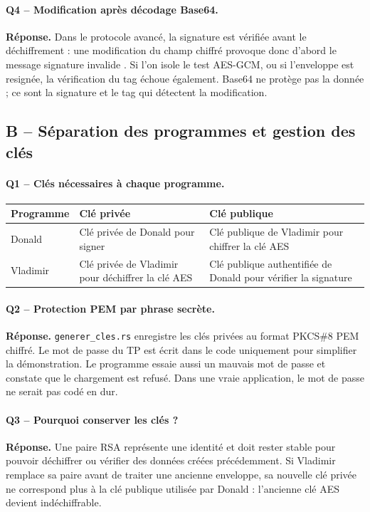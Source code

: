 \documentclass[11pt,a4paper]{article}
\newcommand{\fichier}[1]{\texttt{#1}}
\newcommand{\reponse}{\textbf{Réponse.} }
\begin{document}
\paragraph{Q4 -- Modification après décodage Base64.}
\reponse Dans le protocole avancé, la signature est vérifiée avant le déchiffrement :
une modification du champ chiffré provoque donc d'abord le message
\og signature invalide \fg{}. Si l'on isole le test AES-GCM, ou si l'enveloppe est
resignée, la vérification du tag échoue également. Base64 ne protège pas la donnée ;
ce sont la signature et le tag qui détectent la modification.

\subsection{B -- Séparation des programmes et gestion des clés}

\paragraph{Q1 -- Clés nécessaires à chaque programme.}

\begin{table}[h]
\centering
\begin{tabularx}{\textwidth}{p{2.7cm}X X}
\toprule
\textbf{Programme} & \textbf{Clé privée} & \textbf{Clé publique} \\
\midrule
Donald & Clé privée de Donald pour signer & Clé publique de Vladimir pour chiffrer la clé AES \\
Vladimir & Clé privée de Vladimir pour déchiffrer la clé AES & Clé publique authentifiée de Donald pour vérifier la signature \\
\bottomrule
\end{tabularx}
\end{table}

\paragraph{Q2 -- Protection PEM par phrase secrète.}
\reponse \fichier{generer\_cles.rs} enregistre les clés privées au format PKCS\#8 PEM
chiffré. Le mot de passe du TP est écrit dans le code uniquement pour simplifier la
démonstration. Le programme essaie aussi un mauvais mot de passe et constate que le
chargement est refusé. Dans une vraie application, le mot de passe ne serait pas codé
en dur.

\paragraph{Q3 -- Pourquoi conserver les clés ?}
\reponse Une paire RSA représente une identité et doit rester stable pour pouvoir
déchiffrer ou vérifier des données créées précédemment. Si Vladimir remplace sa paire
avant de traiter une ancienne enveloppe, sa nouvelle clé privée ne correspond plus à la
clé publique utilisée par Donald : l'ancienne clé AES devient indéchiffrable.
\end{document}
